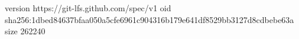 version https://git-lfs.github.com/spec/v1
oid sha256:1dbed84637bfaa050a5cfe6961c904316b179e641df8529bb3127d8cdbebe63a
size 262240
